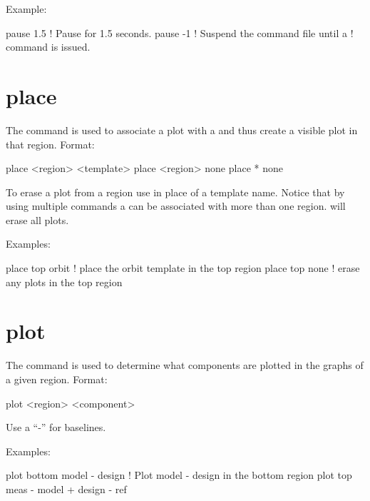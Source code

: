 Example:
\begin{example}
  pause 1.5    ! Pause for 1.5 seconds.
  pause -1     ! Suspend the command file until a  
               !   command is issued.
\end{example}

\section{place}
\label{s:place}

The  command is used to associate a  plot
with a  and thus create a visible plot in that region. Format:
\begin{example}
  place <region> <template>
  place <region> none
  place * none
\end{example}

\vskip 0.2in 

To erase a plot from a region use  in place of a template
name. Notice that by using multiple  commands a
 can be associated with more than one region.
 will erase all plots.

Examples:
\begin{example}
  place top orbit  ! place the orbit template in the top region
  place top none   ! erase any plots in the top region
\end{example}

\section{plot}
\label{s:plot}

The  command is used to determine what components are plotted
in the graphs of a given region. Format:
\begin{example}
  plot <region> <component>
\end{example}

\vskip 0.2in 

Use a ``-'' for baselines. 

Examples:
\begin{example}
  plot bottom model - design       ! Plot model - design in the bottom region
  plot top meas - model + design - ref 
\end{example}

